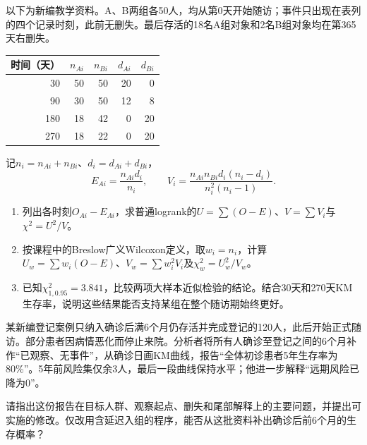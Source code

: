 \par\noindent\begin{minipage}{\linewidth}
以下为新编教学资料。A、B两组各50人，均从第0天开始随访；事件只出现在表列的四个记录时刻，此前无删失。最后存活的18名A组对象和2名B组对象均在第365天右删失。
\begin{center}\begin{tabular}{rrrrr}\toprule
时间（天） & $n_{Ai}$ & $n_{Bi}$ & $d_{Ai}$ & $d_{Bi}$\\\midrule
30 & 50 & 50 & 20 & 0\\
90 & 30 & 50 & 12 & 8\\
180 & 18 & 42 & 0 & 20\\
270 & 18 & 22 & 0 & 20\\\bottomrule
\end{tabular}\end{center}
记$n_i=n_{Ai}+n_{Bi}$、$d_i=d_{Ai}+d_{Bi}$，
\[
E_{Ai}=\frac{n_{Ai}d_i}{n_i},\qquad
V_i=\frac{n_{Ai}n_{Bi}d_i(n_i-d_i)}{n_i^2(n_i-1)}.
\]
\begin{enumerate}
\item 列出各时刻$O_{Ai}-E_{Ai}$，求普通logrank的$U=\sum(O-E)$、$V=\sum V_i$与$\chi^2=U^2/V$。
\item 按课程中的Breslow广义Wilcoxon定义，取$w_i=n_i$，计算
$U_w=\sum w_i(O-E)$、$V_w=\sum w_i^2V_i$及$\chi_w^2=U_w^2/V_w$。
\item 已知$\chi^2_{1,0.95}=3.841$，比较两项大样本近似检验的结论。结合30天和270天KM生存率，说明这些结果能否支持某组在整个随访期始终更好。
\end{enumerate}
\end{minipage}\par\medskip

某新编登记案例只纳入确诊后满6个月仍存活并完成登记的120人，此后开始正式随访。部分患者因病情恶化而停止来院。分析者将所有人确诊至登记之间的6个月补作“已观察、无事件”，从确诊日画KM曲线，报告“全体初诊患者5年生存率为80\%”。5年前风险集仅余3人，最后一段曲线保持水平；他进一步解释“远期风险已降为0”。

请指出这份报告在目标人群、观察起点、删失和尾部解释上的主要问题，并提出可实施的修改。仅改用含延迟入组的程序，能否从这批资料补出确诊后前6个月的生存概率？

